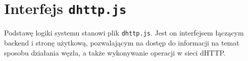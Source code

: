 







\section{Interfejs \texttt{dhttp.js}}

Podstawę logiki systemu stanowi plik \texttt{dhttp.js}. Jest on interfejsem łączącym backend i stronę użytkową, pozwalającym na dostęp do informacji na temat sposobu działania węzła, a także wykonywanie operacji w sieci dHTTP.

